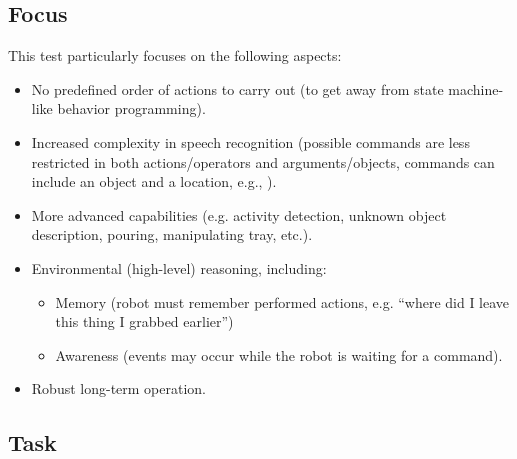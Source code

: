 \subsection{Focus}
This test particularly focuses on the following aspects:
\begin{itemize}
	\item No predefined order of actions to carry out (to get away from state machine-like behavior programming).

	\item Increased complexity in speech recognition (possible commands are less restricted in both actions/operators and arguments/objects, commands can include an object and a location, e.g., ).

	\item More advanced capabilities (e.g. activity detection, unknown object description, pouring, manipulating tray, etc.).

	\item Environmental (high-level) reasoning, including:
  \begin{itemize}
	\item Memory (robot must remember performed actions, e.g. ``where did I leave this thing I grabbed earlier'')
	\item Awareness (events may occur while the robot is waiting for a command).
  \end{itemize}

  \item Robust long-term operation.

\end{itemize}

\subsection{Task}

